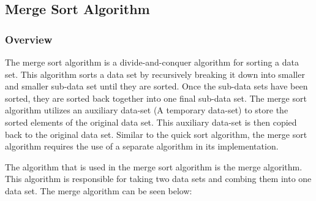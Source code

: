 \subsection*{Merge Sort Algorithm}

\subsubsection*{Overview}

The merge sort algorithm is a divide-and-conquer algorithm for sorting a data set. This algorithm sorts a data set by recursively breaking it down into smaller and smaller sub-data set until they are sorted. Once the sub-data sets have been sorted, they are sorted back together into one final sub-data set. The merge sort algorithm utilizes
an auxiliary data-set (A temporary data-set) to store the sorted elements of the original data set. This auxiliary data-set is then copied back to the original data set. Similar to the quick sort algorithm, the merge sort algorithm requires the use of a separate algorithm in its implementation.

The algorithm that is used in the merge sort algorithm is the merge algorithm. This algorithm is responsible for taking two data sets and combing them into one data set. The merge algorithm can be seen below:

